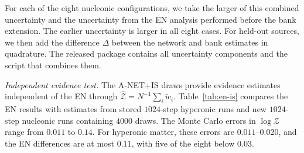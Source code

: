 \documentclass[aps,prd,twocolumn,superscriptaddress,nofootinbib,longbibliography]{revtex4-2}
\begin{document}
For each of the eight nucleonic configurations, we take the larger of this
combined uncertainty and the uncertainty from the EN analysis performed before
the bank extension. The earlier uncertainty is larger in all eight cases. For
held-out sources, we then add the difference $\Delta$ between the network and
bank estimates in quadrature. The released package contains all uncertainty
components and the script that combines them.

\emph{Independent evidence test.} The A-NET+IS draws provide evidence estimates
independent of the EN through $\hat{\mathcal Z}=N^{-1}\sum_i\widetilde w_i$.
Table~\ref{tab:en-is} compares the EN results with estimates from stored
$1024$-step hyperonic runs and new $1024$-step nucleonic runs containing $4000$
draws. The Monte Carlo errors in $\log\mathcal Z$ range from $0.011$ to $0.14$.
For hyperonic matter, these errors are $0.011$--$0.020$, and the EN differences
are at most $0.11$, with five of the eight below $0.03$.

\renewcommand{\bibfont}{\fontsize{8}{8.5}\selectfont}

\end{document}
